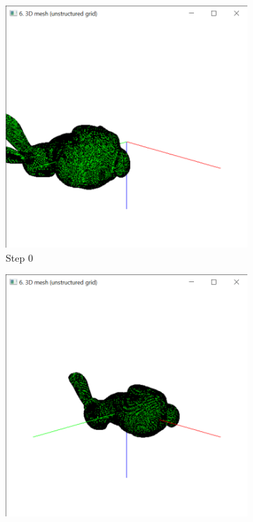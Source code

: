 \documentclass{bigdata}
\begin{document}
\begin{figure}[t!]
	\centering
	\begin{subfigure}[b]{0.4\linewidth}
		\includegraphics[width=\linewidth]{Pictures/Part2/Step0.png}
		\caption{Step 0}
	\end{subfigure}
	\begin{subfigure}[b]{0.4\linewidth}
		\includegraphics[width=\linewidth]{Pictures/Part2/step1.png}

\end{subfigure}
\end{figure}
\end{document}
